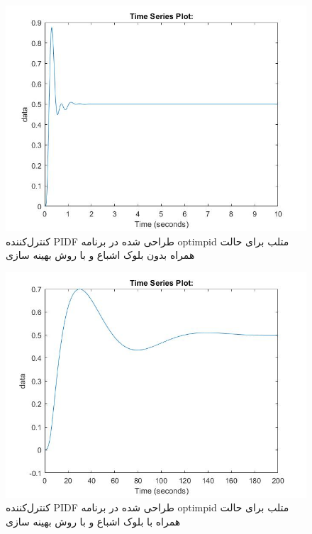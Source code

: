 \begin{figure}[H]
	\centering
	\includegraphics[width=12cm]{../Figure/P_IV/PID_IT2AE_without_sat.jpg}
	\caption{کنترل‌کننده PIDF طراحی شده در برنامه optimpid متلب برای حالت همراه بدون بلوک اشباع و با روش بهینه سازی }
\end{figure}

\begin{figure}[H]
	\centering
	\includegraphics[width=12cm]{../Figure/P_IV/PID_IT2SE_with_sat.jpg}
	\caption{کنترل‌کننده PIDF طراحی شده در برنامه optimpid متلب برای حالت همراه با بلوک اشباع و با روش بهینه سازی }
\end{figure}


